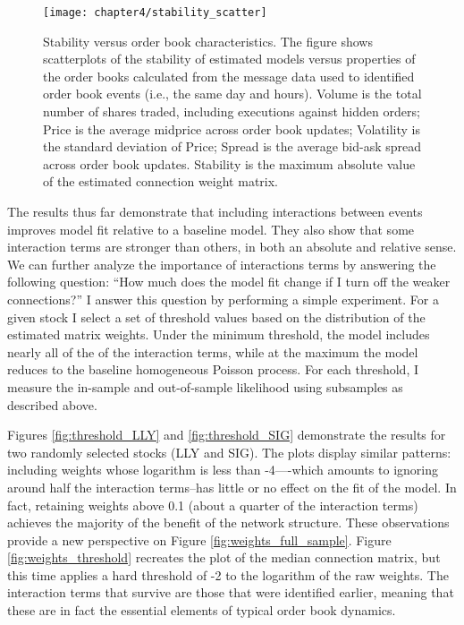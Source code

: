 		\begin{figure}[p]
			\small
			\linespread{1}
			\centering
			\texttt{[image: chapter4/stability\_scatter]}
			\captionsetup{skip=-20pt, position=below, font=footnotesize, justification=justified, width=\linewidth}
			\caption[Stability versus order book characteristics]{Stability versus order book characteristics. The figure shows scatterplots of the stability of estimated models versus properties of the order books calculated from the message data used to identified order book events (i.e., the same day and hours). Volume is the total number of shares traded, including executions against hidden orders; Price is the average midprice across order book updates; Volatility is the standard deviation of Price; Spread is the average bid-ask spread across order book updates. Stability is the maximum absolute value of the estimated connection weight matrix.}
			\label{fig:stability_scatter}
		\end{figure}


		The results thus far demonstrate that including interactions between events improves model fit relative to a baseline model. They also show that some interaction terms are stronger than others, in both an absolute and relative sense. We can further analyze the importance of interactions terms by answering the following question: “How much does the model fit change if I turn off the weaker connections?” I answer this question by performing a simple experiment. For a given stock I select a set of threshold values based on the distribution of the estimated matrix weights. Under the minimum threshold, the model includes nearly all of the of the interaction terms, while at the maximum the model reduces to the baseline homogeneous Poisson process. For each threshold, I measure the in-sample and out-of-sample likelihood using subsamples as described above.

		Figures \ref{fig:threshold_LLY} and \ref{fig:threshold_SIG} demonstrate the results for two randomly selected stocks (LLY and SIG). The plots display similar patterns: including weights whose logarithm is less than -4—-which amounts to ignoring around half the interaction terms--has little or no effect on the fit of the model. In fact, retaining weights above 0.1 (about a quarter of the interaction terms) achieves the majority of the benefit of the network structure. These observations provide a new perspective on Figure \ref{fig:weights_full_sample}. Figure \ref{fig:weights_threshold} recreates the plot of the median connection matrix, but this time applies a hard threshold of -2 to the logarithm of the raw weights. The interaction terms that survive are those that were identified earlier, meaning that these are in fact the essential elements of typical order book dynamics.

